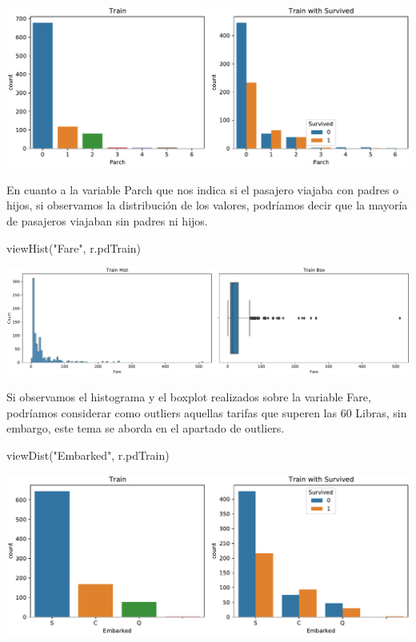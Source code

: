 \documentclass[
]{article}
\newenvironment{Shaded}{\begin{snugshade}}{\end{snugshade}}
\newcommand{\NormalTok}[1]{\textcolor[rgb]{0.80,0.80,0.80}{#1}}
\newcommand{\StringTok}[1]{\textcolor[rgb]{0.80,0.58,0.58}{#1}}
\begin{document}
\includegraphics{m2851_PRA2_aruizplaza_rcotillas_files/figure-latex/unnamed-chunk-10-1.pdf}

En cuanto a la variable Parch que nos indica si el pasajero viajaba con
padres o hijos, si observamos la distribución de los valores, podríamos
decir que la mayoría de pasajeros viajaban sin padres ni hijos.

\begin{Shaded}
\begin{Highlighting}[]
\NormalTok{viewHist(}\StringTok{"Fare"}\NormalTok{, r.pdTrain)}
\end{Highlighting}
\end{Shaded}

\includegraphics{m2851_PRA2_aruizplaza_rcotillas_files/figure-latex/unnamed-chunk-11-1.pdf}

Si observamos el histograma y el boxplot realizados sobre la variable
Fare, podríamos considerar como outliers aquellas tarifas que superen
las 60 Libras, sin embargo, este tema se aborda en el apartado de
outliers.

\begin{Shaded}
\begin{Highlighting}[]
\NormalTok{viewDist(}\StringTok{"Embarked"}\NormalTok{, r.pdTrain)}
\end{Highlighting}
\end{Shaded}

\includegraphics{m2851_PRA2_aruizplaza_rcotillas_files/figure-latex/unnamed-chunk-12-1.pdf}
\end{document}
